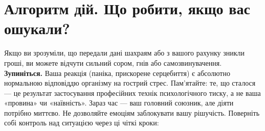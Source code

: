 \section{Алгоритм дій. Що робити, якщо вас ошукали?}

Якщо ви зрозуміли, що передали дані шахраям або з вашого рахунку зникли гроші, ви можете відчути сильний сором, гнів або самозвинувачення. \textbf{Зупиніться.} Ваша реакція (паніка, прискорене серцебиття) є абсолютно нормальною відповіддю організму на гострий стрес. Пам’ятайте: те, що сталося — це результат застосування професійних технік психологічного тиску, а не ваша «провина» чи «наївність». Зараз час — ваш головний союзник, але діяти потрібно миттєво. Не дозволяйте емоціям заблокувати вашу рішучість. Поверніть собі контроль над ситуацією через ці чіткі кроки:

